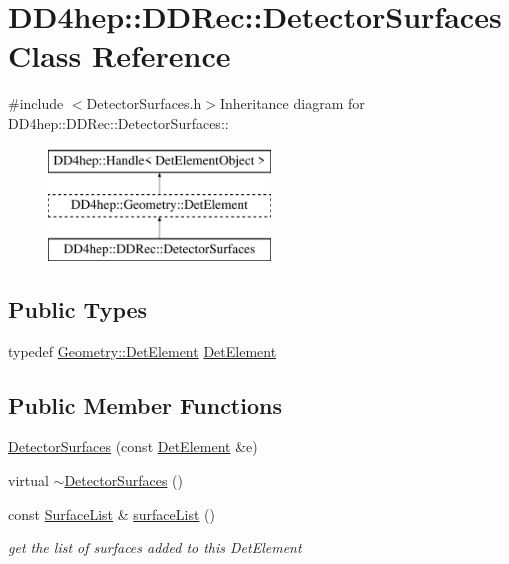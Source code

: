 \hypertarget{class_d_d4hep_1_1_d_d_rec_1_1_detector_surfaces}{
\section{DD4hep::DDRec::DetectorSurfaces Class Reference}
\label{class_d_d4hep_1_1_d_d_rec_1_1_detector_surfaces}
}


{\ttfamily \#include $<$DetectorSurfaces.h$>$}Inheritance diagram for DD4hep::DDRec::DetectorSurfaces::\begin{figure}[H]
\begin{center}
\leavevmode
\includegraphics[height=3cm]{class_d_d4hep_1_1_d_d_rec_1_1_detector_surfaces}
\end{center}
\end{figure}
\subsection*{Public Types}
\begin{DoxyCompactItemize}
\item 
typedef \hyperlink{class_d_d4hep_1_1_geometry_1_1_det_element}{Geometry::DetElement} \hyperlink{class_d_d4hep_1_1_d_d_rec_1_1_detector_surfaces_a1b81ef076a40865045f404fb3e360562}{DetElement}
\end{DoxyCompactItemize}
\subsection*{Public Member Functions}
\begin{DoxyCompactItemize}
\item 
\hyperlink{class_d_d4hep_1_1_d_d_rec_1_1_detector_surfaces_a58d3e7043a5f76b37f9cf042f79b2cc1}{DetectorSurfaces} (const \hyperlink{class_d_d4hep_1_1_geometry_1_1_det_element}{DetElement} \&e)
\item 
virtual \hyperlink{class_d_d4hep_1_1_d_d_rec_1_1_detector_surfaces_aa0ef16856472dab841a659a97386acd0}{$\sim$DetectorSurfaces} ()
\item 
const \hyperlink{class_d_d4hep_1_1_d_d_rec_1_1_surface_list}{SurfaceList} \& \hyperlink{class_d_d4hep_1_1_d_d_rec_1_1_detector_surfaces_a61d2f33c2a7e0ade6737de05e7e795f1}{surfaceList} ()
\begin{DoxyCompactList}\small\item\em get the list of surfaces added to this DetElement \item\end{DoxyCompactList}\end{DoxyCompactItemize}
